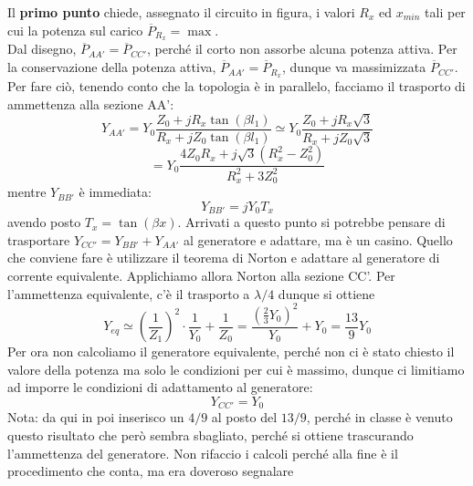 \documentclass{book}
\begin{document}
        Il \textbf{primo punto} chiede, assegnato il circuito in figura, i valori $R_{x}$ ed $x_{min}$ tali per cui
        la potenza sul carico $\overline{P}_{R_{x}}=\max$. \\
        Dal disegno, $\overline{P}_{AA'}=\overline{P}_{CC'}$, perché il corto non assorbe alcuna potenza attiva. Per la conservazione 
        della potenza attiva, $\overline{P}_{AA'}=\overline{P}_{R_{x}}$, dunque va massimizzata $\overline{P}_{CC'}$.
        Per fare ciò, tenendo conto che la topologia è in parallelo, facciamo il trasporto di ammettenza alla sezione AA':
        \begin{equation}
            Y_{AA'}=Y_{0}\frac{Z_{0}+jR_{x}\tan(\beta l_{1})}{R_{x}+jZ_{0}\tan(\beta l_{1})} \simeq Y_{0} \frac{Z_{0}+jR_{x}\sqrt{3}}{R_{x}+jZ_{0}\sqrt{3}}
        \end{equation}
        \begin{equation}
            = Y_{0}\frac{4Z_{0}R_{x}+j\sqrt{3}(R_{x} ^{2}-Z_{0} ^{2})}{R_{x} ^{2}+3Z_{0} ^{2}}
        \end{equation}
        mentre $Y_{BB'}$ è immediata:
        \begin{equation}
            Y_{BB'}=jY_{0}T_{x}
        \end{equation}
        avendo posto $T_{x}=\tan(\beta x)$. Arrivati a questo punto si potrebbe pensare di trasportare $Y_{CC'}=Y_{BB'}+Y_{AA'}$ al generatore 
        e adattare, ma è un casino. Quello che conviene fare è utilizzare il teorema di Norton e adattare al generatore di corrente equivalente.
        Applichiamo allora Norton alla sezione CC'. Per l'ammettenza equivalente, c'è il trasporto a $\lambda /4$ dunque si ottiene
        \begin{equation}
            Y_{eq} \simeq (\frac{1}{Z_{1}})^{2}\cdot \frac{1}{Y_{0}} + \frac{1}{Z_{0}} = \frac{(\frac{2}{3}Y_{0})^{2}}{Y_{0}} +Y_{0}= \frac{13}{9}Y_{0} 
        \end{equation}
        Per ora non calcoliamo il generatore equivalente, perché non ci è stato chiesto il valore della potenza ma solo le condizioni per cui 
        è massimo, dunque ci limitiamo ad imporre le condizioni di adattamento al generatore:
        \begin{equation}
            Y_{CC'}=Y_{0}
        \end{equation}
        Nota: da qui in poi inserisco un $4/9$ al posto del $13/9$, perché in classe è venuto questo risultato che però sembra sbagliato, perché
        si ottiene trascurando l'ammettenza del generatore. Non rifaccio i calcoli perché alla fine è il procedimento che conta, ma era doveroso segnalare
\end{document}
